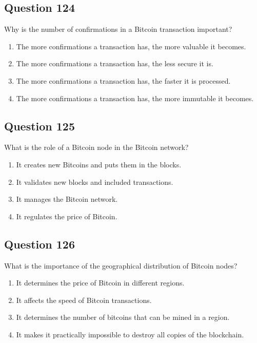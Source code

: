 \documentclass[12pt,a4paper]{article}
\begin{document}
\bigskip


\subsection*{Question 124}
Why is the number of confirmations in a Bitcoin transaction important?

\begin{enumerate}[label=\Alph*., leftmargin=*]
\item The more confirmations a transaction has, the more valuable it becomes.
\item The more confirmations a transaction has, the less secure it is.
\item The more confirmations a transaction has, the faster it is processed.
\item The more confirmations a transaction has, the more immutable it becomes.
\end{enumerate}

\bigskip


\subsection*{Question 125}
What is the role of a Bitcoin node in the Bitcoin network?

\begin{enumerate}[label=\Alph*., leftmargin=*]
\item It creates new Bitcoins and puts them in the blocks.
\item It validates new blocks and included transactions.
\item It manages the Bitcoin network.
\item It regulates the price of Bitcoin.
\end{enumerate}

\bigskip


\subsection*{Question 126}
What is the importance of the geographical distribution of Bitcoin nodes?

\begin{enumerate}[label=\Alph*., leftmargin=*]
\item It determines the price of Bitcoin in different regions.
\item It affects the speed of Bitcoin transactions.
\item It determines the number of bitcoins that can be mined in a region.
\item It makes it practically impossible to destroy all copies of the blockchain.
\end{enumerate}
\end{document}
